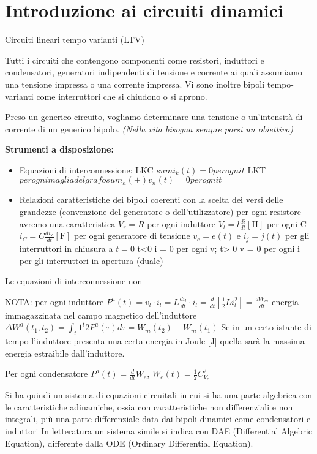 \section{Introduzione ai circuiti dinamici}
Circuiti lineari tempo varianti (LTV)

Tutti i circuiti che contengono componenti come
resistori, induttori e condensatori, generatori indipendenti di tensione e corrente ai quali assumiamo 
una tensione impressa o una corrente impressa.
Vi sono inoltre bipoli tempo-varianti come interruttori che si chiudono o si aprono.

Preso un generico circuito, vogliamo determinare una tensione o un'intensità di corrente di un generico
bipolo.
\textit{(Nella vita bisogna sempre porsi un obiettivo)}

\textbf{Strumenti a disposizione:}

\begin{itemize}
\item Equazioni di interconnessione:
        LKC $ sum i_{k}(t) = 0 per ogni t $
        LKT  $ per ogni maglia del grafo sum_h (\pm)v_n(t) = 0 per ogni t$
\item Relazioni caratteristiche dei bipoli coerenti con la scelta dei versi delle grandezze (convenzione del generatore o dell'utilizzatore)
per ogni resistore avremo una caratteristica $V_r =R$ per ogni induttore $V_l = l\frac{di}{dt} [\si{\henry}]$ per ogni C $i_C = C\frac{dv_c}{dt} [\si{\farad}]$
per ogni generatore di tensione $v_e = e(t)$ e $i_j = j(t)$
per gli interruttori in chiusura a $t=0$ {t<0 i = 0 per ogni v; t> 0 v = 0 per ogni i}
per gli interruttori in apertura (duale) 
\end{itemize}

Le equazioni di interconnessione non  %

NOTA: per ogni induttore $ P^a(t) = v_l\cdot i_l = L \frac{di_l}{dt}\cdot i_l = \frac{d}{dt} [\frac{1}{2}Li_l^2] = \frac{dW_m}{dt} $ energia immagazzinata
nel campo magnetico dell'induttore
$\Delta W^a(t_1,t_2) = \int_t1^t2 P^a(\tau)d\tau = W_m (t_2) - W_m(t_1) $
Se in un certo istante di tempo l'induttore presenta una certa energia in Joule [\si{\joule}] quella sarà la massima energia estraibile
dall'induttore.

Per ogni condensatore $P^a(t) = \frac{d}{dt} W_e$, $W_e(t) = \frac{1}{2} C_{V_c}^2$

Si ha quindi un sistema di equazioni circuitali in cui si ha una parte algebrica con le caratteristiche adinamiche, ossia con caratteristiche
non differenziali e non integrali, più una parte differenziale data dai bipoli dinamici come condensatori e induttori
In letteratura un sistema simile si indica con DAE (Differential Algebric Equation), differente
dalla ODE (Ordinary Differential Equation).


